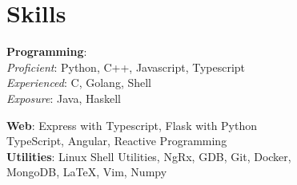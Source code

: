 \section*{\sc Skills}
\vspace{-2mm}
\hrulefill

\textbf{Programming}:\\
\quad \textit{Proficient}: Python, C++, Javascript, Typescript\\
\quad \textit{Experienced}: C, Golang, Shell \\
\quad \textit{Exposure}: Java, Haskell

\textbf{Web}:
Express with Typescript, Flask with Python \\
\quad TypeScript, Angular, Reactive Programming\\

\textbf{Utilities}:
Linux Shell Utilities, NgRx, GDB, Git, Docker, \\ \quad MongoDB, \LaTeX, Vim, Numpy
